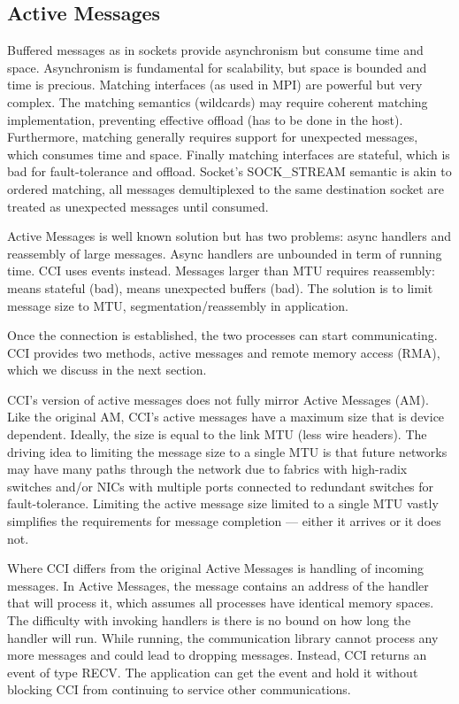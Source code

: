 \subsection{Active Messages}

Buffered messages as in sockets provide asynchronism but consume time and 
space. Asynchronism is fundamental for scalability, but space is bounded and 
time is precious. 
Matching interfaces (as used in MPI) are powerful but very complex. The 
matching semantics (wildcards) may require coherent matching implementation, 
preventing effective offload (has to be done in the host). Furthermore, 
matching generally requires support for unexpected messages, which consumes 
time and space. Finally matching interfaces are stateful, which is bad for 
fault-tolerance and offload.  Socket's SOCK\_STREAM semantic is akin to 
ordered matching, all messages demultiplexed to the same destination socket 
are treated as unexpected messages until consumed.

Active Messages is well known solution but has two problems: async handlers 
and reassembly of large messages.  Async handlers are unbounded in term of 
running time. CCI uses events instead.  Messages larger than MTU requires 
reassembly: means stateful (bad), means unexpected buffers (bad). The solution 
is to limit message size to MTU, segmentation/reassembly in application.

Once the connection is established, the two processes can start communicating. CCI
provides two methods, active messages and remote memory access (RMA), which we discuss in
the next section.

CCI's version of active messages does not fully mirror Active Messages\cite{am} (AM). Like
the original AM, CCI's active messages have a maximum size that is device dependent.
Ideally, the size is equal to the link MTU (less wire headers). The driving idea to
limiting the message size to a single MTU is that future networks may have many paths
through the network due to fabrics with high-radix switches and/or NICs with multiple
ports connected to redundant switches for fault-tolerance.  Limiting the active message
size limited to a single MTU vastly simplifies the requirements for message completion ---
either it arrives or it does not.

Where CCI differs from the original Active Messages is handling of incoming messages.  In
Active Messages, the message contains an address of the handler that will process it,
which assumes all processes have identical memory spaces.  The difficulty with invoking
handlers is there is no bound on how long the handler will run.  While running, the
communication library cannot process any more messages and could lead to dropping
messages. Instead, CCI returns an event of type RECV. The application can get the event
and hold it without blocking CCI from continuing to service other communications.

